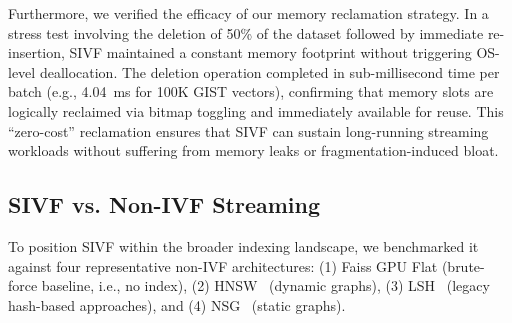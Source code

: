 \documentclass[sigconf,anonymous]{acmart}
\theoremstyle{plain}
\theoremstyle{definition}
\theoremstyle{remark}
\begin{document}
Furthermore, we verified the efficacy of our memory reclamation strategy. In a stress test involving the deletion of 50\% of the dataset followed by immediate re-insertion, SIVF maintained a constant memory footprint without triggering OS-level deallocation. The deletion operation completed in sub-millisecond time per batch (e.g., 4.04~ms for 100K GIST vectors), confirming that memory slots are logically reclaimed via bitmap toggling and immediately available for reuse. This ``zero-cost'' reclamation ensures that SIVF can sustain long-running streaming workloads without suffering from memory leaks or fragmentation-induced bloat.

\subsection{SIVF vs. Non-IVF Streaming}
\label{sec:eval_non_ivf}

To position SIVF within the broader indexing landscape, we benchmarked it against four representative non-IVF architectures: (1) Faiss GPU Flat (brute-force baseline, i.e., no index), (2) HNSW~\cite{malkov2018efficient} (dynamic graphs), (3) LSH~\cite{10.1145/997817.997857} (legacy hash-based approaches), and (4) NSG~\cite{10.14778/3303753.3303754} (static graphs).

\begin{table}[t]
\caption{Comparison of ingestion throughput (K vec/s) and deletion latency (ms) across different datasets.}
\label{tab:landscape_full}
\centering
{}
\end{table}
\end{document}
